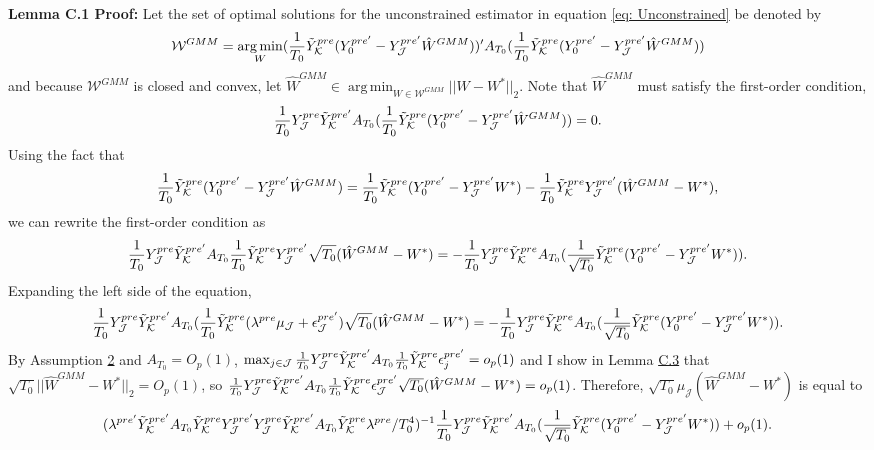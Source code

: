 \documentclass{article}
\DeclareMathOperator*{\argmin}{arg\,min}
\begin{document}
\textbf{Lemma C.1 Proof:} Let the set of optimal solutions for the unconstrained estimator in equation \eqref{eq: Unconstrained} be denoted by
\begin{equation*}
    \mathcal{W}^{GMM} = \argmin_{W} 
    (\frac{1}{T_0}\Tilde{Y}_{\mathcal{K}}^{pre}(Y_{0}^{pre'} - Y_{\mathcal{J}}^{pre'}\hat{W}^{GMM}))'A_{T_0}(\frac{1}{T_0}\Tilde{Y}_{\mathcal{K}}^{pre}(Y_{0}^{pre'} - Y_{\mathcal{J}}^{pre'}\hat{W}^{GMM}))
\end{equation*}
and because $\mathcal{W}^{GMM}$ is closed and convex, let $\hat{W}^{GMM} \in \argmin_{W \in \mathcal{W}^{GMM}} ||W - W^*||_2$. Note that $\hat{W}^{GMM}$ must satisfy the first-order condition, 
$$\frac{1}{T_0}Y_{\mathcal{J}}^{pre} \Tilde{Y}_{\mathcal{K}}^{pre'}A_{T_0} (\frac{1}{T_0}\Tilde{Y}_{\mathcal{K}}^{pre}(Y_{0}^{pre'} - Y_{\mathcal{J}}^{pre'}\hat{W}^{GMM})) = 0.$$
Using the fact that
$$ \frac{1}{T_0}\Tilde{Y}_{\mathcal{K}}^{pre}(Y_{0}^{pre'} - Y_{\mathcal{J}}^{pre'}\hat{W}^{GMM}) =  \frac{1}{T_0}\Tilde{Y}_{\mathcal{K}}^{pre}(Y_{0}^{pre'} - Y_{\mathcal{J}}^{pre'}W^*) - \frac{1}{T_0}\Tilde{Y}_{\mathcal{K}}^{pre} Y_{\mathcal{J}}^{pre'}(\hat{W}^{GMM} - W^*),$$
we can rewrite the first-order condition as 
$$\frac{1}{T_0}Y_{\mathcal{J}}^{pre} \Tilde{Y}_{\mathcal{K}}^{pre'}A_{T_0} \frac{1}{T_0}\Tilde{Y}_{\mathcal{K}}^{pre} Y_{\mathcal{J}}^{pre'} \sqrt{T_0}(\hat{W}^{GMM} - W^*) = - \frac{1}{T_0}Y_{\mathcal{J}}^{pre} \Tilde{Y}_{\mathcal{K}}^{pre} A_{T_0} (\frac{1}{\sqrt{T_0}}\Tilde{Y}_{\mathcal{K}}^{pre}(Y_{0}^{pre'} - Y_{\mathcal{J}}^{pre'}W^*)). $$
Expanding the left side of the equation,
$$\frac{1}{T_0}Y_{\mathcal{J}}^{pre} \Tilde{Y}_{\mathcal{K}}^{pre'}A_{T_0} (\frac{1}{T_0}\Tilde{Y}_{\mathcal{K}}^{pre} (\lambda^{pre}\mu_{\mathcal{J}} + \epsilon_{\mathcal{J}}^{pre'}) \sqrt{T_0}(\hat{W}^{GMM} - W^*) = - \frac{1}{T_0}Y_{\mathcal{J}}^{pre} \Tilde{Y}_{\mathcal{K}}^{pre} A_{T_0} (\frac{1}{\sqrt{T_0}}\Tilde{Y}_{\mathcal{K}}^{pre}(Y_{0}^{pre'} - Y_{\mathcal{J}}^{pre'}W^*)) .$$
By Assumption \hyperref[A2]{2} and $A_{T_0} = O_p(1)$, $\max_{j \in \mathcal{J}} \frac{1}{T_0}Y_{\mathcal{J}}^{pre} \Tilde{Y}_{\mathcal{K}}^{pre'}A_{T_0}  \frac{1}{T_0} \Tilde{Y}_{\mathcal{K}}^{pre} \epsilon_{j}^{pre'} = o_p(1)$ and I show in Lemma \hyperref[LC3]{C.3} that $\sqrt{T_0}||\hat{W}^{GMM} - W^*||_2 = O_p(1)$, so $\frac{1}{T_0}Y_{\mathcal{J}}^{pre} \Tilde{Y}_{\mathcal{K}}^{pre'}A_{T_0} \frac{1}{T_0} \Tilde{Y}_{\mathcal{K}}^{pre} \epsilon_{\mathcal{J}}^{pre'}\sqrt{T_0}(\hat{W}^{GMM} - W^*) = o_p(1)$. Therefore, $\sqrt{T_0}\mu_{\mathcal{J}}(\hat{W}^{GMM} - W^*)$ is equal to
$$(\lambda^{pre'}\Tilde{Y}_{\mathcal{K}}^{pre'}A_{T_0} \Tilde{Y}_{\mathcal{K}}^{pre}Y_{\mathcal{J}}^{pre'} Y_{\mathcal{J}}^{pre} \Tilde{Y}_{\mathcal{K}}^{pre'}A_{T_0} \Tilde{Y}_{\mathcal{K}}^{pre} \lambda^{pre}/T_0^4)^{-1} \frac{1}{T_0} Y_{\mathcal{J}}^{pre} \Tilde{Y}_{\mathcal{K}}^{pre'} A_{T_0}(\frac{1}{\sqrt{T_0}}\Tilde{Y}_{\mathcal{K}}^{pre}(Y_{0}^{pre'} - Y_{\mathcal{J}}^{pre'}W^*)) + o_p(1).$$
\end{document}
